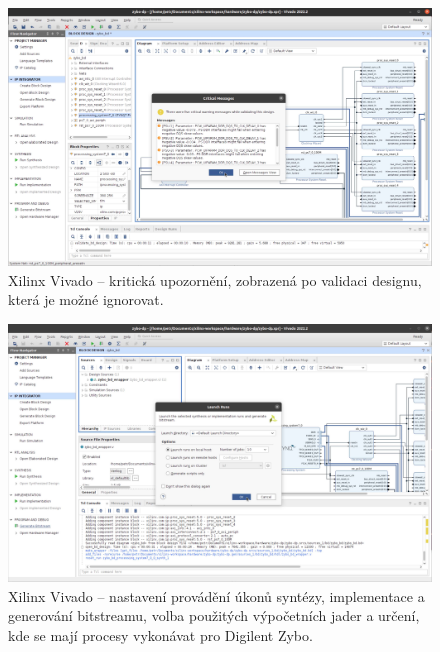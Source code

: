 \documentclass[a4paper, twoside, 11pt]{article}
\begin{document}
\begin{appendices}
		\begin{figure}[htbp!]
			\centering
			\includegraphics[width=1\textwidth]{src/png/zybo-xilinx-vivado-flow/zybo-xilinx-vivado-flow-24.jpg}
			\caption{Xilinx Vivado – kritická upozornění, zobrazená po validaci designu, která je možné ignorovat.}
			\label{fig:zybo-xilinx-vivado-flow-24}
		\end{figure}


		\begin{figure}[htbp!]
			\centering
			\includegraphics[width=1\textwidth]{src/png/zybo-xilinx-vivado-flow/zybo-xilinx-vivado-flow-29.jpg}
			\caption{Xilinx Vivado – nastavení provádění úkonů syntézy, implementace a generování bitstreamu, volba použitých výpočetních jader a určení, kde se mají procesy vykonávat pro Digilent Zybo.}
			\label{fig:zybo-xilinx-vivado-flow-29}
		\end{figure}


\end{appendices}
\end{document}

